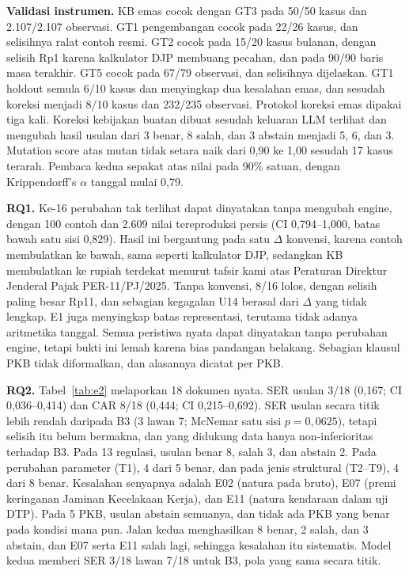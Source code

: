 \documentclass[conference]{IEEEtran}
\makeatletter
\DeclareRobustCommand{\en}[1]{{\usefont{\f@encoding}{\f@family}{\f@series}{it}#1\/}}
\makeatother
\begin{document}
\textbf{Validasi instrumen.} KB emas cocok dengan GT3 pada 50/50 kasus dan 2.107/2.107 observasi. GT1 pengembangan cocok pada 22/26 kasus, dan selisihnya ralat contoh resmi. GT2 cocok pada 15/20 kasus bulanan, dengan selisih Rp1 karena kalkulator DJP membuang pecahan, dan pada 90/90 baris masa terakhir. GT5 cocok pada 67/79 observasi, dan selisihnya dijelaskan. GT1 \en{holdout} semula 6/10 kasus dan menyingkap dua kesalahan emas, dan sesudah koreksi menjadi 8/10 kasus dan 232/235 observasi. Protokol koreksi emas dipakai tiga kali. Koreksi kebijakan buatan dibuat sesudah keluaran LLM terlihat dan mengubah hasil usulan dari 3 benar, 8 salah, dan 3 \en{abstain} menjadi 5, 6, dan 3. \en{Mutation score} atas mutan tidak setara naik dari 0,90 ke 1,00 sesudah 17 kasus terarah. Pembaca kedua sepakat atas nilai pada 90\% satuan, dengan Krippendorff's $\alpha$ tanggal mulai 0,79.

\textbf{RQ1.} Ke-16 perubahan tak terlihat dapat dinyatakan tanpa mengubah \en{engine}, dengan 100 contoh dan 2.609 nilai tereproduksi persis (CI 0,794--1,000, batas bawah satu sisi 0,829). Hasil ini bergantung pada satu $\Delta$ konvensi, karena contoh membulatkan ke bawah, sama seperti kalkulator DJP, sedangkan KB membulatkan ke rupiah terdekat menurut tafsir kami atas Peraturan Direktur Jenderal Pajak PER-11/PJ/2025. Tanpa konvensi, 8/16 lolos, dengan selisih paling besar Rp11, dan sebagian kegagalan U14 berasal dari $\Delta$ yang tidak lengkap. E1 juga menyingkap batas representasi, terutama tidak adanya aritmetika tanggal. Semua peristiwa nyata dapat dinyatakan tanpa perubahan \en{engine}, tetapi bukti ini lemah karena bias pandangan belakang. Sebagian klausul PKB tidak diformalkan, dan alasannya dicatat per PKB.

\textbf{RQ2.} Tabel~\ref{tab:e2} melaporkan 18 dokumen nyata. SER usulan 3/18 (0,167; CI 0,036--0,414) dan CAR 8/18 (0,444; CI 0,215--0,692). SER usulan secara titik lebih rendah daripada B3 (3 lawan 7; McNemar satu sisi $p = 0{,}0625$), tetapi selisih itu belum bermakna, dan yang didukung data hanya non-inferioritas terhadap B3. Pada 13 regulasi, usulan benar 8, salah 3, dan \en{abstain} 2. Pada perubahan parameter (T1), 4 dari 5 benar, dan pada jenis struktural (T2--T9), 4 dari 8 benar. Kesalahan senyapnya adalah E02 (natura pada bruto), E07 (premi keringanan Jaminan Kecelakaan Kerja), dan E11 (natura kendaraan dalam uji DTP). Pada 5 PKB, usulan \en{abstain} semuanya, dan tidak ada PKB yang benar pada kondisi mana pun. Jalan kedua menghasilkan 8 benar, 2 salah, dan 3 \en{abstain}, dan E07 serta E11 salah lagi, sehingga kesalahan itu sistematis. Model kedua memberi SER 3/18 lawan 7/18 untuk B3, pola yang sama secara titik.
\end{document}
